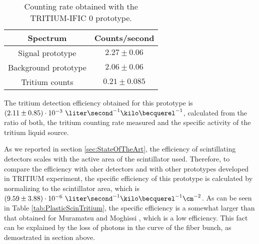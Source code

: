 \begin{table}[htbp]
\centering{}%
\begin{tabular}{cc}
\toprule 
Spectrum & Counts/second \tabularnewline
\midrule
\midrule 
Signal prototype & $2.27 \pm 0.06$ \tabularnewline
Background prototype & $2.06 \pm 0.06$ \tabularnewline  
Tritium counts & $0.21 \pm 0.085$ \tabularnewline
\bottomrule
\end{tabular}
\caption{Counting rate obtained with the TRITIUM-IFIC 0 prototype.}
\label{tab:CountsPerSecondTRITIUMIFIC0}
\end{table}

The tritium detection efficiency obtained for this prototype is $(2.11 \pm 0.85)\cdot{} 10^{-3}~\liter\second^{-1}\kilo\becquerel^{-1}$, calculated from the ratio of both, the tritium counting rate measured and the specific activity of the tritium liquid source. 

As we reported in section \ref{sec:StateOfTheArt}, the efficiency of scintillating detectors scales with the active area of the scintillator used. Therefore, to compare the efficiency with oher detectors and with other prototypes developed in TRITIUM experiment, the specific efficiency of this prototype is calculated by normalizing to the scintillator area, which is $(9.59 \pm 3.88)\cdot{} 10^{-6}~\liter\second^{-1}\kilo\becquerel^{-1}\cm^{-2}$. As can be seen in Table \ref{tab:PlasticScinTritium}, the specific efficiency is a somewhat larger than that obtained for Muramatsu and Moghissi \cite{Moghissi}, which is a low efficiency. This fact can be explained by the loss of photons in the curve of the fiber bunch, as demostrated in section above.







